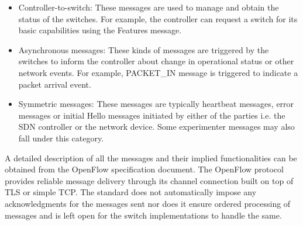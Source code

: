 \begin{itemize}
 \item Controller-to-switch: These messages are used to manage and obtain the status of the switches. For example, the controller can request a switch for its basic capabilities using the Features message.\\
 \item Asynchronous messages: These kinds of messages are triggered by the switches to inform the controller about change in operational status or other network events. For example, PACKET\_IN message is triggered to indicate a packet arrival event.\\
 \item Symmetric messages: These messages are typically heartbeat messages, error messages or initial Hello messages initiated by either of the parties i.e. the SDN controller or the network device. Some experimenter messages may also fall under this category.
\end{itemize}A detailed description of all the messages and their implied functionalities can be obtained from the OpenFlow specification document\cite{OFSwitchSpecification}. The OpenFlow protocol provides reliable message delivery through its channel connection built on top of TLS or simple TCP. The standard does not automatically impose any acknowledgments for the messages sent nor does it ensure ordered processing of messages and is left open for the switch implementations to handle the same.

